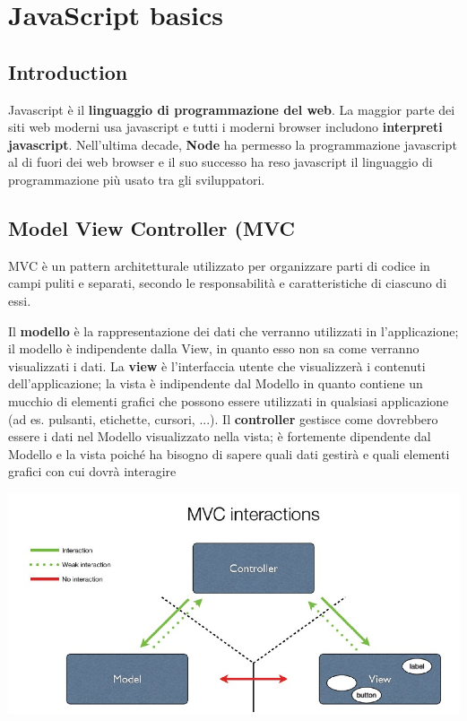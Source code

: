  
 \chapter{JavaScript basics}
 \section{Introduction}
 Javascript è il \textbf{linguaggio di programmazione del web}. La maggior parte dei siti web moderni usa javascript e tutti i moderni browser includono \textbf{interpreti javascript}. Nell'ultima decade, \textbf{Node} ha permesso la programmazione javascript al di fuori dei web browser e il suo successo ha reso javascript il linguaggio di programmazione più usato tra gli sviluppatori.
 
 \section{Model View Controller (MVC}
MVC è un pattern architetturale utilizzato per organizzare parti di codice in 
campi puliti e separati, secondo le responsabilità e
caratteristiche di ciascuno di essi.

Il \textbf{modello} è la rappresentazione dei dati che verranno utilizzati in
l'applicazione; il modello è indipendente dalla View, in quanto esso
non sa come verranno visualizzati i dati. La \textbf{view} è l'interfaccia utente che visualizzerà i contenuti dell'applicazione; la vista è indipendente dal Modello in quanto contiene un mucchio di elementi grafici che possono essere utilizzati in qualsiasi applicazione (ad es. pulsanti, etichette, cursori, ...).
Il \textbf{controller} gestisce come dovrebbero essere i dati nel Modello
visualizzato nella vista; è fortemente dipendente dal Modello e
la vista poiché ha bisogno di sapere quali dati gestirà e quali
elementi grafici con cui dovrà interagire

\begin{center}
    \includegraphics[scale=0.4]{Images/TecnologieWeb/8/MVC.jpg}
\end{center}

